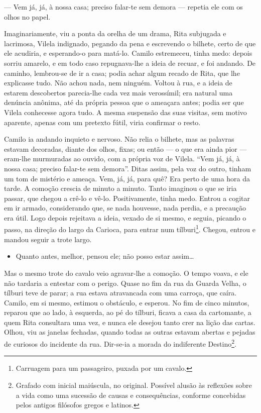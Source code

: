 --- Vem já, já, à nossa casa; preciso falar-te sem demora --- repetia ele
com os olhos no papel.

Imaginariamente, viu a ponta da orelha de um drama, Rita subjugada e
lacrimosa, Vilela indignado, pegando da pena e escrevendo o bilhete,
certo de que ele acudiria, e esperando-o para matá-lo. Camilo
estremeceu, tinha medo: depois sorriu amarelo, e em todo caso
repugnava-lhe a ideia de recuar, e foi andando. De caminho, lembrou-se
de ir a casa; podia achar algum recado de Rita, que lhe explicasse tudo.
Não achou nada, nem ninguém. Voltou à rua, e a ideia de estarem
descobertos parecia-lhe cada vez mais verossímil; era natural uma
denúncia anônima, até da própria pessoa que o ameaçara antes; podia ser
que Vilela conhecesse agora tudo. A mesma suspensão das suas visitas,
sem motivo aparente, apenas com um pretexto fútil, viria confirmar o
resto.

Camilo ia andando inquieto e nervoso. Não relia o bilhete, mas as
palavras estavam decoradas, diante dos olhos, fixas; ou então --- o que
era ainda pior --- eram-lhe murmuradas ao ouvido, com a própria voz de
Vilela. ``Vem já, já, à nossa casa; preciso falar-te sem demora''. Ditas
assim, pela voz do outro, tinham um tom de mistério e ameaça. Vem, já,
já, para quê? Era perto de uma hora da tarde. A comoção crescia de
minuto a minuto. Tanto imaginou o que se iria passar, que chegou a
crê-lo e vê-lo. Positivamente, tinha medo. Entrou a cogitar em ir
armado, considerando que, se nada houvesse, nada perdia, e a precaução
era útil. Logo depois rejeitava a ideia, vexado de si mesmo, e seguia,
picando o passo, na direção do largo da Carioca, para entrar
num tílburi\footnote{Carruagem para um passageiro, puxada por um cavalo.}.
Chegou, entrou e mandou seguir a trote largo.

\begin{itemize}
\item
  Quanto antes, melhor, pensou ele; não posso estar assim\ldots{}
\end{itemize}

Mas o mesmo trote do cavalo veio agravar-lhe a comoção. O tempo voava, e
ele não tardaria a entestar com o perigo. Quase no fim da rua da Guarda
Velha, o tílburi teve de parar; a rua estava atravancada com uma
carroça, que caíra. Camilo, em si mesmo, estimou o obstáculo, e esperou.
No fim de cinco minutos, reparou que ao lado, à esquerda, ao pé
do tílburi, ficava a casa da cartomante, a quem Rita consultara uma vez,
e nunca ele desejou tanto crer na lição das cartas. Olhou, viu as
janelas fechadas, quando todas as outras estavam abertas e pejadas de
curiosos do incidente da rua. Dir-se-ia a morada do
indiferente Destino\footnote{Grafado com inicial maiúscula, no original.
  Possível alusão às reflexões sobre a vida como uma sucessão de causas
  e consequências, conforme concebidas pelos antigos filósofos gregos e
  latinos.}.

